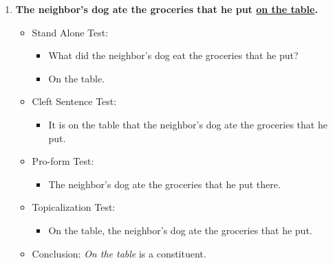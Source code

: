\documentclass[12pt]{article}
\begin{document}
\begin{enumerate}
   \item \textbf{The neighbor's dog ate the groceries that he put \underline{on the table}.}
   \begin{itemize}
       \item Stand Alone Test:
       \begin{itemize}
           \item What did the neighbor's dog eat the groceries that he put?
           \item On the table.
       \end{itemize}
       \item Cleft Sentence Test:
       \begin{itemize}
           \item It is on the table that the neighbor’s dog ate the groceries that he put.
       \end{itemize}
       \item Pro-form Test:
       \begin{itemize}
           \item The neighbor’s dog ate the groceries that he put there.
       \end{itemize}
       \item Topicalization Test:
       \begin{itemize}
           \item On the table, the neighbor’s dog ate the groceries that he put.
       \end{itemize}
       \item Conclusion: \textit{On the table} is a constituent.
   \end{itemize}


\end{enumerate}
\end{document}
